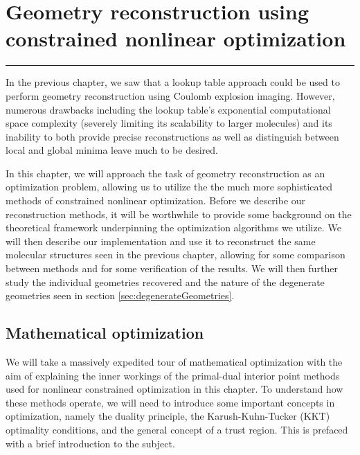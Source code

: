 \chapter{Geometry reconstruction using constrained nonlinear optimization}\label{ch:optimization}

\vspace{-1.5 em}
\begin{addmargin}[-0.5cm]{0cm}
  \minitoc
\end{addmargin}
\hrule
\vspace{1.5 em}

In the previous chapter, we saw that a lookup table approach could be used to perform geometry reconstruction using Coulomb explosion imaging. However, numerous drawbacks including the lookup table's exponential computational space complexity (severely limiting its scalability to larger molecules) and its inability to both provide precise reconstructions as well as distinguish between local and global minima leave much to be desired.

In this chapter, we will approach the task of geometry reconstruction as an optimization problem, allowing us to utilize the the much more sophisticated methods of constrained nonlinear optimization. Before we describe our reconstruction methods, it will be worthwhile to provide some background on the theoretical framework underpinning the optimization algorithms we utilize. We will then describe our implementation and use it to reconstruct the same molecular structures seen in the previous chapter, allowing for some comparison between methods and for some verification of the results. We will then further study the individual geometries recovered and the nature of the degenerate geometries seen in section \ref{sec:degenerateGeometries}. %

\section{Mathematical optimization}
We will take a massively expedited tour of mathematical optimization with the aim of explaining the inner workings of the primal-dual interior point methods used for nonlinear constrained optimization in this chapter. To understand how these methods operate, we will need to introduce some important concepts in optimization, namely the duality principle, the Karush-Kuhn-Tucker (KKT) optimality conditions, and the general concept of a trust region. This is prefaced with a brief introduction to the subject.

